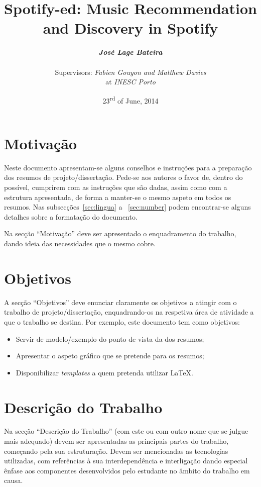 \documentclass[twocolumn]{article}
\title{
  \huge
  \textbf{
    Spotify-ed: Music Recommendation and Discovery in Spotify
  }
}
\author{
  \large{\emph{\textbf{José Lage Bateira}}} \\ \\
  Supervisors: \emph{Fabien Gouyon and Matthew Davies}  \\
  at \emph{INESC Porto}
}
\date{23\textsuperscript{rd} of June, 2014}
\begin{document}
\maketitle

\thispagestyle{empty}

\section{Motivação}\label{sec:motiva}

Neste documento apresentam-se alguns conselhos e instruções para a preparação dos resumos de projeto/dissertação. 
Pede-se aos autores o favor de, dentro do possível, cumprirem com as instruções que são dadas, assim como com a estrutura apresentada, de forma a manter-se o mesmo aspeto em todos os resumos. 
Nas subsecções~\ref{sec:lingua} a ~\ref{sec:number} podem encontrar-se alguns detalhes sobre a formatação do documento. 

Na secção ``Motivação'' deve ser apresentado o enquadramento do trabalho, dando ideia das necessidades que o mesmo cobre.

\section{Objetivos}\label{sec:goals}

A secção ``Objetivos'' deve enunciar claramente os objetivos a atingir com o trabalho de projeto/dissertação, enquadrando-os na respetiva área de atividade a que o trabalho se destina. 
Por exemplo, este documento tem como objetivos:
\begin{itemize}
\item Servir de modelo/exemplo do ponto de vista da dos resumos;
\item Apresentar o aspeto gráfico que se pretende para os resumos;
\item Disponibilizar \emph{templates} a quem pretenda utilizar \LaTeX.
\end{itemize}

\section{Descrição do Trabalho}\label{sec:work}

Na secção ``Descrição do Trabalho'' (com este ou com outro nome que se julgue mais adequado) devem ser apresentadas as principais partes do trabalho, começando pela sua estruturação. Devem ser mencionadas as tecnologias utilizadas, com referências à sua interdependência e interligação dando especial ênfase aos componentes desenvolvidos pelo estudante no âmbito do trabalho em causa.
\end{document}
